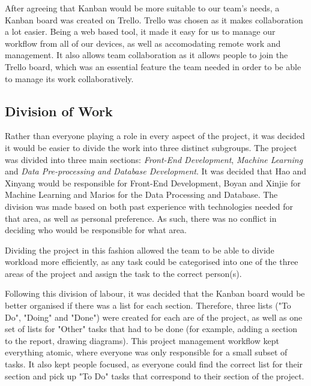 \documentclass[titlepage]{article}
\begin{document}
After agreeing that Kanban would be more suitable to our team's needs, a Kanban board was created on Trello. Trello was chosen as it makes collaboration a lot easier. Being a web based tool, it made it easy for us to manage our workflow from all of our devices, as well as accomodating remote work and management. It also allows team collaboration as it allows people to join the Trello board, which was an essential feature the team needed in order to be able to manage its work collaboratively.

\subsection{Division of Work\label{work_division}}
Rather than everyone playing a role in every aspect of the project, it was decided it would be easier to divide the work into three distinct subgroups. The project was divided into three main sections: \textit{Front-End Development}, \textit{Machine Learning} and \textit{Data Pre-processing and Database Development}. It was decided that Hao and Xinyang would be responsible for Front-End Development, Boyan and Xinjie for Machine Learning and Marios for the Data Processing and Database. The division was made based on both past experience with technologies needed for that area, as well as personal preference. As such, there was no conflict in deciding who would be responsible for what area.

Dividing the project in this fashion allowed the team to be able to divide workload more efficiently, as any task could be categorised into one of the three areas of the project and assign the task to the correct person(s).

Following this division of labour, it was decided that the Kanban board would be better organised if there was a list for each section. Therefore, three lists ("To Do", "Doing" and "Done") were created for each are of the project, as well as one set of lists for "Other" tasks that had to be done (for example, adding a section to the report, drawing diagrams). This project management workflow kept everything atomic, where everyone was only responsible for a small subset of tasks. It also kept people focused, as everyone could find the correct list for their section and pick up "To Do" tasks that correspond to their section of the project.

\pagebreak
\printbibliography
\end{document}
